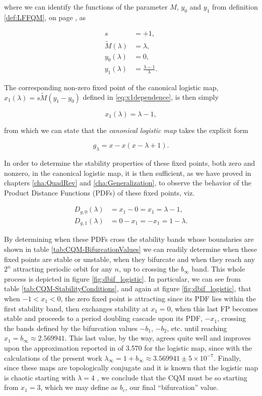 \documentclass[10pt,twoside,titlepage]{book}
\numberwithin{equation}{chapter}
\numberwithin{figure}{chapter}
\numberwithin{table}{chapter}
\theoremstyle{plain}%
\theoremstyle{definition}
\theoremstyle{remark}
\begin{document}
where we can identify the functions of the parameter $M$, $y_0$ and $y_1$ from definition \ref{def:LFFQM}, on page \pageref{def:LFFQM}, as

\begin{align}
	s &= +1,\\
	\tilde{M}(\lambda) &= \lambda,\\
	y_0(\lambda) &= 0,\\
	y_1(\lambda) &= \frac{\lambda-1}{\lambda}.
\end{align}

The corresponding non-zero fixed point of the canonical logistic map, $x_1(\lambda)=s\tilde{M}(y_1-y_0)$ defined in \eqref{eq:x1dependence}, is then simply

\begin{equation}
	x_1(\lambda)=\lambda-1,
\end{equation}

from which we can state that the \emph{canonical logistic map} takes the explicit form

\begin{equation}\label{eq:CanonicalLogistic}
	g_{\lambda}=x-x(x-\lambda+1).
\end{equation}

In order to determine the stability properties of these fixed points, both zero and nonzero, in the canonical logistic map, it is then sufficient, as we have proved in chapters \ref{cha:QuadRev} and \ref{cha:Generalization}, to observe the behavior of the Product Distance Functions (PDFs) of these fixed points, viz.

\begin{align}
	D_{g, 0}(\lambda) &= x_1-0 = x_1 = \lambda -1,\\
	D_{g, 1}(\lambda) &= 0-x_1 = -x_1 = 1-\lambda.
\end{align}

By determining when these PDFs cross the stability bands whose boundaries are shown in table \ref{tab:CQM-BifurcationValues} we can readily determine when these fixed points are stable or unstable, when they bifurcate and when they reach any $2^n$ attracting periodic orbit for any $n$, up to crossing the $b_{\infty}$ band. This whole process is depicted in figure \ref{fig:dbif_logistic}. In particular, we can see from table \ref{tab:CQM-StabilityConditions}, and again at figure \ref{fig:dbif_logistic}, that when $-1<x_1<0$, the zero fixed point is attracting since its PDF lies within the first stability band, then exchanges stability at $x_1=0$, when this last FP becomes stable and proceeds to a period doubling cascade upon its PDF, $-x_1$, crossing the bands defined by the bifurcation values $-b_1$, $-b_2$, etc. until reaching $x_1=b_{\infty}\approx 2.569941$. This last value, by the way, agrees quite well and improves upon the approximation reported in \cite{Elaydi2008} of 3.570 for the logistic map, since with the calculations of the present work $\lambda_{\infty}=1+b_{\infty}\approx 3.569941\pm5\times10^{-7}$. Finally, since these maps are topologically conjugate and it is known that the logistic map is chaotic starting with $\lambda=4$ \cite{Elaydi2008}, we conclude that the CQM must be so starting from $x_1=3$, which we may define as $b_c$, our final ``bifurcation'' value.
\end{document}
